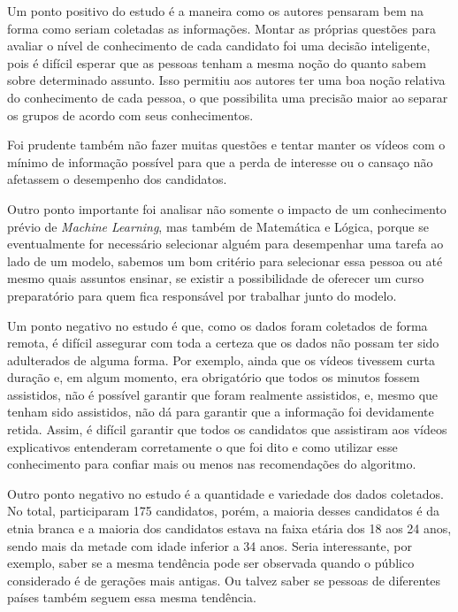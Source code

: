 \documentclass[11221709.tex]{subfiles}
\begin{document}
    Um ponto positivo do estudo é a maneira como os autores pensaram
    bem na forma como seriam coletadas as informações. Montar as
    próprias questões para avaliar o nível de conhecimento de cada
    candidato foi uma decisão inteligente, pois é difícil esperar
    que as pessoas tenham a mesma noção do quanto sabem sobre
    determinado assunto. Isso permitiu aos autores ter uma boa noção
    relativa do conhecimento de cada pessoa, o que possibilita uma
    precisão maior ao separar os grupos de acordo com seus
    conhecimentos.

    Foi prudente também não fazer muitas questões e tentar manter os
    vídeos com o mínimo de informação possível para que a perda de
    interesse ou o cansaço não afetassem o desempenho dos
    candidatos.

    Outro ponto importante foi analisar não somente o impacto de um
    conhecimento prévio de \textit{Machine Learning}, mas também de
    Matemática e Lógica, porque se eventualmente for necessário
    selecionar alguém para desempenhar uma tarefa ao lado de um
    modelo, sabemos um bom critério para selecionar essa pessoa ou
    até mesmo quais assuntos ensinar, se existir a possibilidade de
    oferecer um curso preparatório para quem fica responsável por
    trabalhar junto do modelo.

    Um ponto negativo no estudo é que, como os dados foram coletados
    de forma remota, é difícil assegurar com toda a certeza que os
    dados não possam ter sido adulterados de alguma forma. Por
    exemplo, ainda que os vídeos tivessem curta duração e, em algum
    momento, era obrigatório que todos os minutos fossem assistidos,
    não é possível garantir que foram realmente assistidos, e, mesmo
    que tenham sido assistidos, não dá para garantir que a
    informação foi devidamente retida. Assim, é difícil garantir que
    todos os candidatos que assistiram aos vídeos explicativos
    entenderam corretamente o que foi dito e como utilizar esse
    conhecimento para confiar mais ou menos nas recomendações do
    algoritmo.

    Outro ponto negativo no estudo é a quantidade e variedade dos
    dados coletados. No total, participaram 175 candidatos, porém, a
    maioria desses candidatos é da etnia branca e a maioria dos
    candidatos estava na faixa etária dos 18 aos 24 anos, sendo mais
    da metade com idade inferior a 34 anos. Seria interessante, por
    exemplo, saber se a mesma tendência pode ser observada quando o
    público considerado é de gerações mais antigas. Ou talvez saber
    se pessoas de diferentes países também seguem essa mesma
    tendência.
\end{document}
